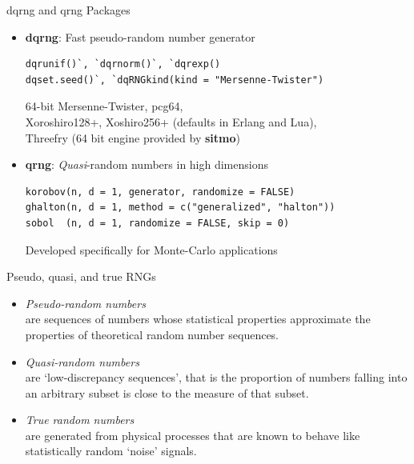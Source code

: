 \documentclass[ignorenonframetext,]{beamer}
\begin{document}
\begin{frame}[fragile]{dqrng and qrng Packages}
\protect\hypertarget{dqrng-and-qrng-packages}{}

\begin{itemize}
\item
  \textbf{dqrng}: Fast pseudo-random number generator

\begin{verbatim}
dqrunif()`, `dqrnorm()`, `dqrexp()
dqset.seed()`, `dqRNGkind(kind = "Mersenne-Twister")
\end{verbatim}

  64-bit Mersenne-Twister, pcg64,\\
  Xoroshiro128+, Xoshiro256+ (defaults in Erlang and Lua),\\
  Threefry (64 bit engine provided by \textbf{sitmo})
\item
  \textbf{qrng}: \emph{Quasi}-random numbers in high dimensions

\begin{verbatim}
korobov(n, d = 1, generator, randomize = FALSE)
ghalton(n, d = 1, method = c("generalized", "halton"))
sobol  (n, d = 1, randomize = FALSE, skip = 0)
\end{verbatim}

  Developed specifically for Monte-Carlo applications
\end{itemize}

\end{frame}

\begin{frame}{Pseudo, quasi, and true RNGs}
\protect\hypertarget{pseudo-quasi-and-true-rngs}{}

\begin{itemize}
\item
  \emph{Pseudo-random numbers}\\
  are sequences of numbers whose statistical properties approximate the
  properties of theoretical random number sequences.
\item
  \emph{Quasi-random numbers}\\
  are `low-discrepancy sequences', that is the proportion of numbers
  falling into an arbitrary subset is close to the measure of that
  subset.
\item
  \emph{True random numbers}\\
  are generated from physical processes that are known to behave like
  statistically random `noise' signals.
\end{itemize}

\end{frame}
\end{document}
